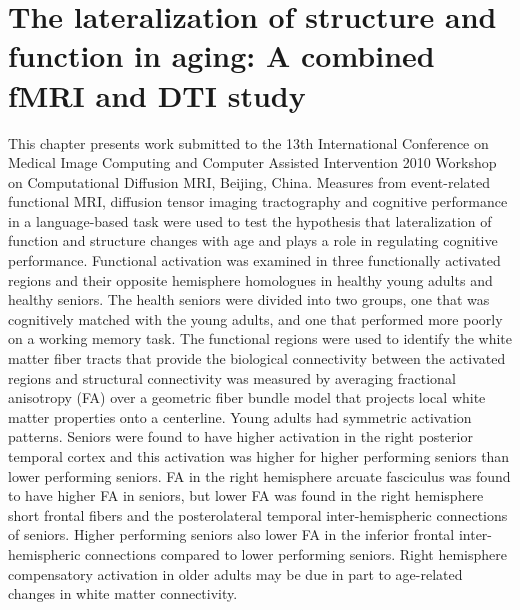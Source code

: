 \chapter{The lateralization of structure and function in aging: A combined fMRI and DTI study}
\label{chap_lat}

This chapter presents work submitted to the 13th International Conference on Medical Image Computing and Computer Assisted Intervention 2010 Workshop on Computational Diffusion MRI, Beijing, China. Measures from event-related functional MRI, diffusion tensor imaging tractography and cognitive performance in a language-based task were used to test the hypothesis that lateralization of function and structure changes with age and plays a role in regulating cognitive performance.  Functional activation was examined in three functionally activated regions and their opposite hemisphere homologues in healthy young adults and healthy seniors. The health seniors were divided into two groups, one that was cognitively matched with the young adults, and one that performed more poorly on a working memory task. The functional regions were used to identify the white matter fiber tracts that provide the biological connectivity between the activated regions and structural connectivity was measured by averaging fractional anisotropy (FA) over a geometric fiber bundle model that projects local white matter properties onto a centerline. Young adults had symmetric activation patterns. Seniors were found to have higher activation in the right posterior temporal cortex and this activation was higher for higher performing seniors than lower performing seniors. FA in the right hemisphere arcuate fasciculus was found to have higher FA in seniors, but lower FA was found in the right hemisphere short frontal fibers and the posterolateral temporal inter-hemispheric connections of seniors. Higher performing seniors also lower FA in the inferior frontal inter-hemispheric connections compared to lower performing seniors. Right hemisphere compensatory activation in older adults may be due in part to age-related changes in white matter connectivity.


